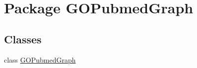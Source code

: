 \hypertarget{namespace_g_o_pubmed_graph}{
\section{Package GOPubmedGraph}
\label{namespace_g_o_pubmed_graph}
}
\subsection*{Classes}
\begin{DoxyCompactItemize}
\item 
class \hyperlink{class_g_o_pubmed_graph_1_1_g_o_pubmed_graph}{GOPubmedGraph}
\end{DoxyCompactItemize}
